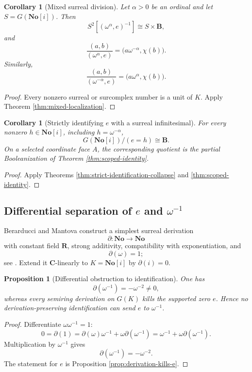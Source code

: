 \documentclass[11pt]{amsart}
\numberwithin{equation}{section}
\newtheorem{proposition}[theorem]{Proposition}
\newtheorem{corollary}[theorem]{Corollary}
\theoremstyle{definition}
\newcommand{\B}{\mathbf B}
\newcommand{\R}{\mathbf R}
\newcommand{\C}{\mathbf C}
\newcommand{\No}{\mathbf{No}}
\begin{document}
\begin{corollary}[Mixed surreal division]\label{cor:mixed-surreal-division}
Let $\alpha>0$ be an ordinal and let $S=G(\No[i])$.  Then
\[
S^2[(\omega^\alpha,e)^{-1}]
\cong
S\times\B,
\]
and
\[
\frac{(a,b)}{(\omega^\alpha,e)}
=
\bigl(a\omega^{-\alpha},\chi(b)\bigr).
\]
Similarly,
\[
\frac{(a,b)}{(\omega^{-\alpha},e)}
=
\bigl(a\omega^{\alpha},\chi(b)\bigr).
\]
\end{corollary}

\begin{proof}
Every nonzero surreal or surcomplex number is a unit of $K$.  Apply Theorem \ref{thm:mixed-localization}.
\end{proof}

\begin{corollary}[Strictly identifying $e$ with a surreal infinitesimal]
For every nonzero $h\in\No[i]$, including $h=\omega^{-\alpha}$,
\[
G(\No[i])/(e=h)\cong\B.
\]
On a selected coordinate face $A$, the corresponding quotient is the partial Booleanization of Theorem \ref{thm:scoped-identity}.
\end{corollary}

\begin{proof}
Apply Theorems \ref{thm:strict-identification-collapse} and \ref{thm:scoped-identity}.
\end{proof}

\subsection{Differential separation of $e$ and $\omega^{-1}$}

Berarducci and Mantova construct a simplest surreal derivation
\[
\partial:\No\longrightarrow\No
\]
with constant field $\R$, strong additivity, compatibility with exponentiation, and
\[
\partial(\omega)=1;
\]
see \cite{BerarducciMantova}.  Extend it $\C$-linearly to $K=\No[i]$ by $\partial(i)=0$.

\begin{proposition}[Differential obstruction to identification]\label{prop:differential-obstruction}
One has
\[
\partial(\omega^{-1})=-\omega^{-2}\neq0,
\]
whereas every semiring derivation on $G(K)$ kills the supported zero $e$.  Hence no derivation-preserving identification can send $e$ to $\omega^{-1}$.
\end{proposition}

\begin{proof}
Differentiate $\omega\omega^{-1}=1$:
\[
0
=
\partial(1)
=
\partial(\omega)\omega^{-1}
+
\omega\partial(\omega^{-1})
=
\omega^{-1}
+
\omega\partial(\omega^{-1}).
\]
Multiplication by $\omega^{-1}$ gives
\[
\partial(\omega^{-1})=-\omega^{-2}.
\]
The statement for $e$ is Proposition \ref{prop:derivation-kills-e}.
\end{proof}
\end{document}
